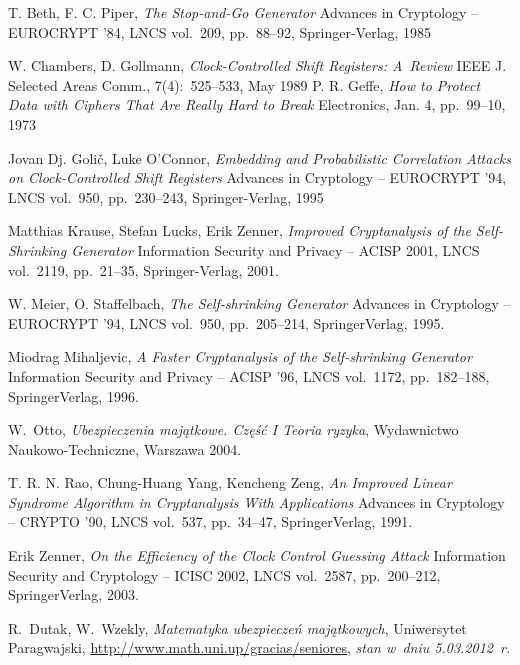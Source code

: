 \documentclass[12pt]{mwbk}
\theoremstyle{plain}
\theoremstyle{definition}
\theoremstyle{remark}
\begin{document}
\begin{thebibliography}{99}


T. Beth, F. C. Piper, \emph{The Stop-and-Go Generator} Advances in Cryptology -- EUROCRYPT '84, LNCS vol.~209, pp.~88--92, Springer-Verlag, 1985

W. Chambers, D. Gollmann, \emph{Clock-Controlled Shift Registers: A~Review} IEEE J. Selected Areas Comm., 7(4):~525--533, May 1989
P. R. Geffe, \emph{How to Protect Data with Ciphers That Are Really Hard to Break} Electronics, Jan. 4, pp.~99--10, 1973


Jovan Dj. Goli\v{c}, Luke O'Connor, \emph{Embedding and Probabilistic Correlation Attacks on Clock-Controlled Shift Registers} Advances in Cryptology -- EUROCRYPT '94, LNCS vol.~950, pp.~230--243, Springer-Verlag, 1995

Matthias Krause, Stefan Lucks, Erik Zenner, \emph{Improved
Cryptanalysis of the Self-Shrinking Generator} Information Security
and Privacy -- ACISP 2001, LNCS vol.~2119, pp.~21--35,
Springer-Verlag, 2001.

W. Meier, O. Staffelbach, \emph{The Self-shrinking Generator} Advances
in Cryptology -- EUROCRYPT '94, LNCS vol.~950, pp.~205--214,
Springer\dywiz Verlag, 1995.

Miodrag Mihaljevic, \emph{A Faster Cryptanalysis of the Self-shrinking
Generator} Information Security and Privacy -- ACISP '96, LNCS
vol.~1172, pp.~182--188, Springer\dywiz Verlag, 1996.

W.~Otto, \emph{Ubezpieczenia majątkowe. Część I Teoria ryzyka},
Wydawnictwo Naukowo-Techniczne, Warszawa 2004.

T. R. N. Rao, Chung-Huang Yang, Kencheng Zeng, \emph{An Improved
Linear Syndrome Algorithm in Cryptanalysis With Applications} Advances
in Cryptology -- CRYPTO '90, LNCS vol.~537, pp.~34--47,
Springer\dywiz Verlag, 1991.


Erik Zenner, \emph{On the Efficiency of the Clock Control Guessing
Attack} Information Security and Cryptology -- ICISC 2002, LNCS
vol.~2587, pp.~200--212, Springer\dywiz Verlag, 2003.

R.~Dutak, W.~Wzekly, \emph{Matematyka ubezpieczeń majątkowych},
Uniwersytet Paragwajski,
\url{http://www.math.uni.up/gracias/seniores}, \emph{stan w~dniu
5.03.2012~r.}

\end{thebibliography}
\end{document}
